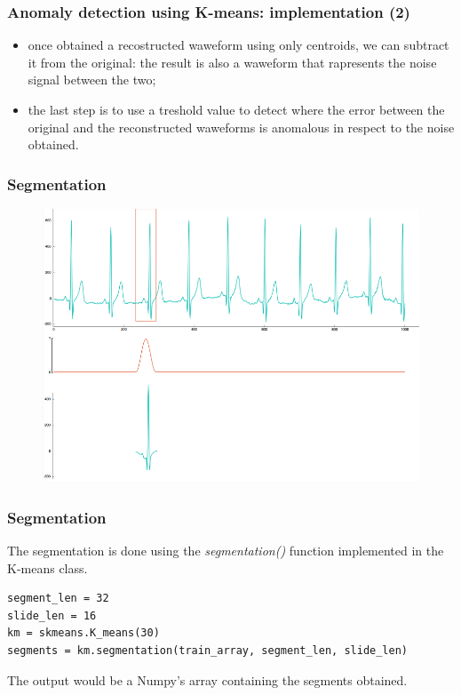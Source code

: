 \documentclass[xcolor ={table,usenames,dvipsnames}]{beamer}
\theoremstyle{definition}
\begin{document}
	\begin{frame}
		\frametitle{Anomaly detection using K-means: implementation (2)}
		\begin{itemize}
			\item once obtained a recostructed waweform using only centroids, we can subtract it from the original: the result is also a waweform that rapresents the noise signal between the two;
			\item the last step is to use a treshold value to detect where the error between the original and the reconstructed waweforms is anomalous in respect to the noise obtained. 
		\end{itemize}
	\end{frame}

	\begin{frame}
		\frametitle{Segmentation}
		\begin{figure}[h!]
			\centering
			\includegraphics[scale=0.25]{img/segmentation.png}
		\end{figure}
	\end{frame}

	\begin{frame}[fragile]
		\frametitle{Segmentation}
		
		The segmentation is done using the \textit{segmentation()} function implemented in the K-means class.
		
		\begin{lstlisting}
segment_len = 32
slide_len = 16
km = skmeans.K_means(30)
segments = km.segmentation(train_array, segment_len, slide_len)
		\end{lstlisting}
		
		The output would be a Numpy's array containing the segments obtained.
			 
		\end{frame}
\end{document}
